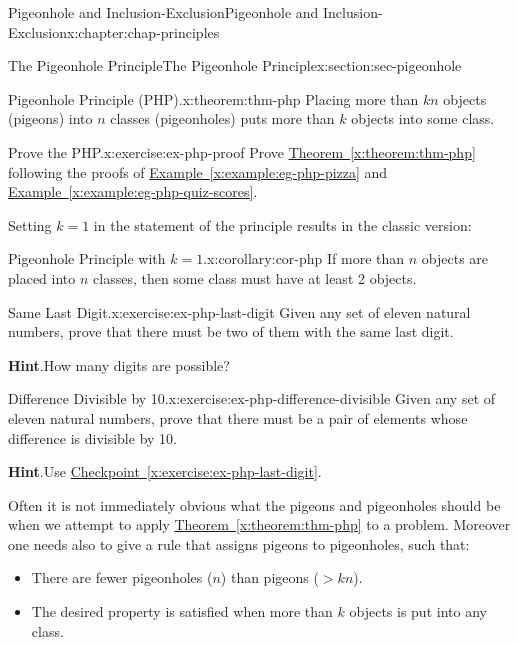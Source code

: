 \documentclass[oneside,10pt,]{book}
\newcommand{\blocktitlefont}{\relax}
\newcommand{\xreffont}{\relax}
\numberwithin{equation}{section}
\newcommand{\gt}{>}
\begin{document}
\begin{chapterptx}{Pigeonhole and Inclusion-Exclusion}{}{Pigeonhole and Inclusion-Exclusion}{}{}{x:chapter:chap-principles}
\begin{sectionptx}{The Pigeonhole Principle}{}{The Pigeonhole Principle}{}{}{x:section:sec-pigeonhole}
\begin{theorem}{Pigeonhole Principle (PHP).}{}{x:theorem:thm-php}%
Placing more than \(kn\) objects (pigeons) into \(n\) classes (pigeonholes) puts more than \(k\) objects into some class.%
\end{theorem}
\begin{inlineexercise}{Prove the PHP.}{x:exercise:ex-php-proof}%
Prove \hyperref[x:theorem:thm-php]{Theorem~{\xreffont\ref{x:theorem:thm-php}}} following the proofs of \hyperref[x:example:eg-php-pizza]{Example~{\xreffont\ref{x:example:eg-php-pizza}}} and \hyperref[x:example:eg-php-quiz-scores]{Example~{\xreffont\ref{x:example:eg-php-quiz-scores}}}.%
\end{inlineexercise}
Setting \(k = 1\) in the statement of the principle results in the classic version:%
\begin{corollary}{Pigeonhole Principle with \(k=1\).}{}{x:corollary:cor-php}%
If more than \(n\) objects are placed into \(n\) classes, then some class must have at least 2 objects.%
\end{corollary}
\begin{inlineexercise}{Same Last Digit.}{x:exercise:ex-php-last-digit}%
Given any set of eleven natural numbers, prove that there must be two of them with the same last digit.%
\par\smallskip%
\noindent\textbf{\blocktitlefont Hint}.\hypertarget{g:hint:id223761}{}\quad{}How many digits are possible?%
\end{inlineexercise}
\begin{inlineexercise}{Difference Divisible by 10.}{x:exercise:ex-php-difference-divisible}%
Given any set of eleven natural numbers, prove that there must be a pair of elements whose difference is divisible by 10.%
\par\smallskip%
\noindent\textbf{\blocktitlefont Hint}.\hypertarget{g:hint:id223847}{}\quad{}Use \hyperref[x:exercise:ex-php-last-digit]{Checkpoint~{\xreffont\ref{x:exercise:ex-php-last-digit}}}.%
\end{inlineexercise}
Often it is not immediately obvious what the pigeons and pigeonholes should be when we attempt to apply \hyperref[x:theorem:thm-php]{Theorem~{\xreffont\ref{x:theorem:thm-php}}} to a problem. Moreover one needs also to give a rule that assigns pigeons to pigeonholes, such that:%
\begin{itemize}[label=\textbullet]
\item{}There are fewer pigeonholes (\(n\)) than pigeons (\(\gt kn\)).%
\item{}The desired property is satisfied when more than \(k\) objects is put into any class.%

\end{itemize}
\end{sectionptx}
\end{chapterptx}
\end{document}
